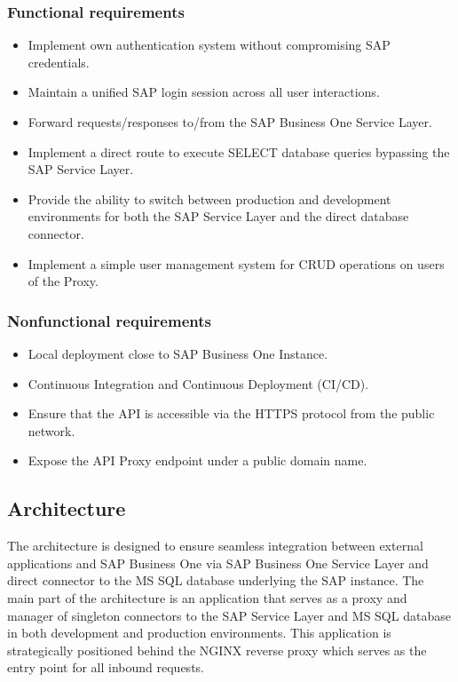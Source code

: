 \subsubsection{Functional requirements}
\label{subsubs:functional-requirements}
\begin{itemize}
    \item Implement own authentication system without compromising SAP credentials.
    \item Maintain a unified SAP login session across all user interactions.
    \item Forward requests/responses to/from the SAP Business One Service Layer.
    \item Implement a direct route to execute SELECT database queries bypassing the SAP Service Layer.
    \item Provide the ability to switch between production and development environments for both the SAP Service Layer and the direct database connector.
    \item Implement a simple user management system for CRUD operations on users of the Proxy.
\end{itemize}

\subsubsection{Nonfunctional requirements}
\label{subsubsec:nonfunctional-requirements}
\begin{itemize}
    \item Local deployment close to SAP Business One Instance.
    \item Continuous Integration and Continuous Deployment (CI/CD).
    \item Ensure that the API is accessible via the HTTPS protocol from the public network.
    \item Expose the API Proxy endpoint under a public domain name.
\end{itemize}

\subsection{Architecture}
\label{subsec:architecture}
The architecture is designed to ensure seamless integration between external applications and SAP Business One via SAP Business One Service Layer and direct connector to the MS SQL database underlying the SAP instance. 
The main part of the architecture is an application that serves as a proxy and manager of singleton connectors to the SAP Service Layer and MS SQL database in both development and production environments.
This application is strategically positioned behind the NGINX reverse proxy which serves as the entry point for all inbound requests.

